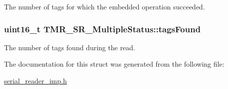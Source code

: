 The number of tags for which the embedded operation succeeded. \hypertarget{struct_t_m_r___s_r___multiple_status_262a33ff5eaeeca63b18a6f36ac0f75e}{
\subsubsection[{tagsFound}]{\setlength{\rightskip}{0pt plus 5cm}uint16\_\-t {\bf TMR\_\-SR\_\-MultipleStatus::tagsFound}}}
\label{struct_t_m_r___s_r___multiple_status_262a33ff5eaeeca63b18a6f36ac0f75e}


The number of tags found during the read. 

The documentation for this struct was generated from the following file:\begin{CompactItemize}
\item 
\hyperlink{serial__reader__imp_8h}{serial\_\-reader\_\-imp.h}\end{CompactItemize}
